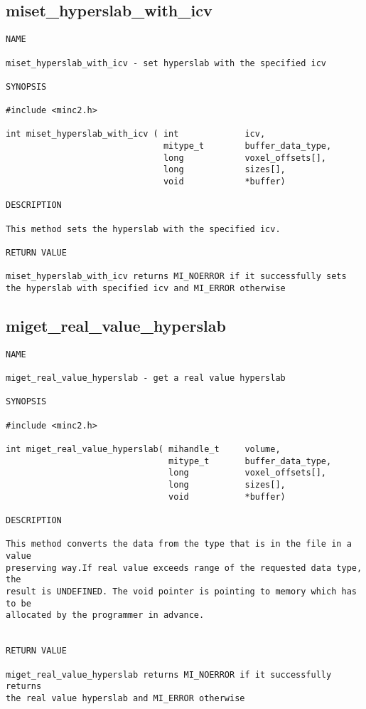 \documentclass{article}
\begin{document}
\subsection{miset\_hyperslab\_with\_icv}
\begin{verbatim}
NAME

miset_hyperslab_with_icv - set hyperslab with the specified icv

SYNOPSIS

#include <minc2.h>

int miset_hyperslab_with_icv ( int             icv,
                               mitype_t        buffer_data_type,
                               long            voxel_offsets[],
                               long            sizes[],
                               void            *buffer)                
                                        
DESCRIPTION

This method sets the hyperslab with the specified icv.

RETURN VALUE

miset_hyperslab_with_icv returns MI_NOERROR if it successfully sets
the hyperslab with specified icv and MI_ERROR otherwise
\end{verbatim}

\subsection{miget\_real\_value\_hyperslab}
\begin{verbatim}
NAME

miget_real_value_hyperslab - get a real value hyperslab

SYNOPSIS

#include <minc2.h>

int miget_real_value_hyperslab( mihandle_t     volume,
                                mitype_t       buffer_data_type,
                                long           voxel_offsets[],
                                long           sizes[],
                                void           *buffer)

DESCRIPTION

This method converts the data from the type that is in the file in a value
preserving way.If real value exceeds range of the requested data type, the
result is UNDEFINED. The void pointer is pointing to memory which has to be 
allocated by the programmer in advance.


RETURN VALUE

miget_real_value_hyperslab returns MI_NOERROR if it successfully returns
the real value hyperslab and MI_ERROR otherwise
\end{verbatim}
\end{document}
